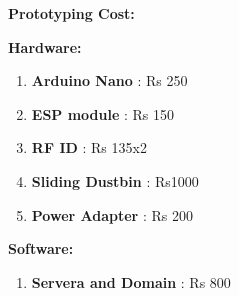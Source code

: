 \textup{\huge {\bf Prototyping Cost: } \\[0.01in] }

\textup{\large {\bf Hardware: } \\[0.00001in] }
\begin{enumerate} %
	\item{\normalsize {\bf Arduino Nano} : Rs 250}
	\item {\normalsize  {\bf ESP module} : Rs 150 }
	\item {\normalsize  {\bf RF ID } :  Rs 135x2 }
	\item {\normalsize  {\bf Sliding Dustbin } :  Rs1000  }
	\item {\normalsize {\bf Power Adapter} : Rs 200 \\}
\end{enumerate}
\textup{\large {\bf Software: } \\[0.00001in] }
\begin{enumerate} %
	\item{\normalsize {\bf Servera and Domain} : Rs 800}

\end{enumerate}
\newpage
